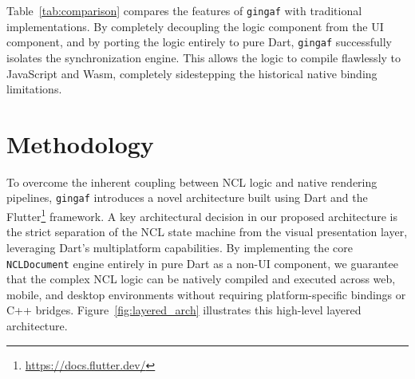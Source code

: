 \documentclass[sigconf]{webmedia}
\newcommand{\projectname}{\texttt{gingaf}}
\begin{document}
Table~\ref{tab:comparison} compares the features of \projectname{} with traditional implementations. By completely decoupling the logic component from the UI component, and by porting the logic entirely to pure Dart, \projectname{} successfully isolates the synchronization engine. This allows the logic to compile flawlessly to JavaScript and Wasm, completely sidestepping the historical native binding limitations.

\section{Methodology}
\label{sec:methodology}

To overcome the inherent coupling between NCL logic and native rendering pipelines, \projectname{} introduces a novel architecture built using Dart and the Flutter\footnote{\url{https://docs.flutter.dev/}} framework. A key architectural decision in our proposed architecture is the strict separation of the NCL state machine from the visual presentation layer, leveraging Dart's multiplatform capabilities. By implementing the core \texttt{NCLDocument} engine entirely in pure Dart as a non-UI component, we guarantee that the complex NCL logic can be natively compiled and executed across web, mobile, and desktop environments without requiring platform-specific bindings or C++ bridges. Figure~\ref{fig:layered_arch} illustrates this high-level layered architecture. 
\end{document}
